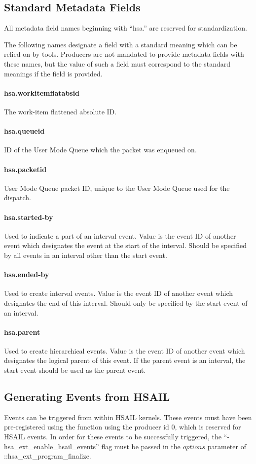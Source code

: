 \documentclass[oneside]{book}
\begin{document}
\subsection{Standard Metadata Fields}
All metadata field names beginning with ``hsa.'' are reserved for standardization. 

The following names designate a field with a standard meaning which can be relied on by tools. Producers are not mandated to provide metadata fields with these names, but the value of such a field must correspond to the standard meanings if the field is provided.

\paragraph{hsa.workitemflatabsid} The work-item flattened absolute ID.
\paragraph{hsa.queueid} ID of the User Mode Queue which the packet was enqueued on.
\paragraph{hsa.packetid} User Mode Queue packet ID, unique to the User Mode Queue used for the dispatch.
\paragraph{hsa.started-by} Used to indicate a part of an interval event. Value is the event ID of another event which designates the event at the start of the interval. Should be specified by all events in an interval other than the start event.
\paragraph{hsa.ended-by} Used to create interval events. Value is the event ID of another event which designates the end of this interval. Should only be specified by the start event of an interval.
\paragraph{hsa.parent} Used to create hierarchical events. Value is the event ID of another event which designates the logical parent of this event. If the parent event is an interval, the start event should be used as the parent event.


\subsection{Generating Events from HSAIL}
Events can be triggered from within HSAIL kernels. These events must have been pre-registered using the  function using the producer id 0, which is reserved for HSAIL events. In order for these events to be successfully triggered, the ``-hsa_ext_enable_hsail_events'' flag must be passed in the $options$ parameter of ::hsa_ext_program_finalize.
\end{document}
